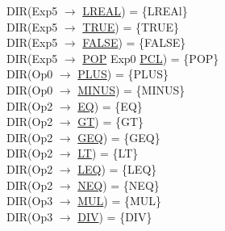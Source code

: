\documentclass[\main/MemoriaPL.tex]{subfiles}
\begin{document}
    DIR(Exp5 $\rightarrow$ \underline{LREAL}) = \{LREAl\}\\
    DIR(Exp5 $\rightarrow$ \underline{TRUE}) = \{TRUE\}\\
    DIR(Exp5 $\rightarrow$ \underline{FALSE}) = \{FALSE\}\\
    DIR(Exp5 $\rightarrow$ \underline{POP} Exp0 \underline{PCL}) = \{POP\}\\
    DIR(Op0 $\rightarrow$ \underline{PLUS}) = \{PLUS\}\\
    DIR(Op0 $\rightarrow$ \underline{MINUS}) = \{MINUS\}\\
    DIR(Op2 $\rightarrow$ \underline{EQ}) = \{EQ\}\\
    DIR(Op2 $\rightarrow$ \underline{GT}) = \{GT\}\\
    DIR(Op2 $\rightarrow$ \underline{GEQ}) = \{GEQ\}\\
    DIR(Op2 $\rightarrow$ \underline{LT}) = \{LT\}\\
    DIR(Op2 $\rightarrow$ \underline{LEQ}) = \{LEQ\}\\
    DIR(Op2 $\rightarrow$ \underline{NEQ}) = \{NEQ\}\\
    DIR(Op3 $\rightarrow$ \underline{MUL}) = \{MUL\}\\
    DIR(Op3 $\rightarrow$ \underline{DIV}) = \{DIV\}\\
\end{document}

